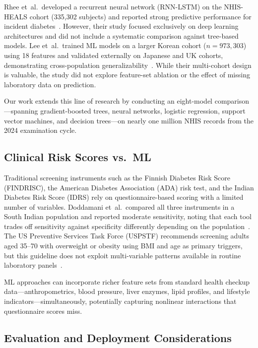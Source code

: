 Rhee et~al.\ developed a recurrent neural network (RNN-LSTM) on the NHIS-HEALS cohort (335{,}302 subjects) and reported strong predictive performance for incident diabetes~\cite{Rhee2021deeplearning}.  However, their study focused exclusively on deep learning architectures and did not include a systematic comparison against tree-based models.  Lee et~al.\ trained ML models on a larger Korean cohort ($n = 973{,}303$) using 18 features and validated externally on Japanese and UK cohorts, demonstrating cross-population generalizability~\cite{Lee2025multicohort}.  While their multi-cohort design is valuable, the study did not explore feature-set ablation or the effect of missing laboratory data on prediction.

Our work extends this line of research by conducting an eight-model comparison---spanning gradient-boosted trees, neural networks, logistic regression, support vector machines, and decision trees---on nearly one million NHIS records from the 2024 examination cycle.

\subsection{Clinical Risk Scores vs.\ ML}
\label{sec:rw-risk-scores}

Traditional screening instruments such as the Finnish Diabetes Risk Score (FINDRISC), the American Diabetes Association (ADA) risk test, and the Indian Diabetes Risk Score (IDRS) rely on questionnaire-based scoring with a limited number of variables.  Doddamani et~al.\ compared all three instruments in a South Indian population and reported moderate sensitivity, noting that each tool trades off sensitivity against specificity differently depending on the population~\cite{Doddamani2021comparative}.  The US Preventive Services Task Force (USPSTF) recommends screening adults aged 35--70 with overweight or obesity using BMI and age as primary triggers, but this guideline does not exploit multi-variable patterns available in routine laboratory panels~\cite{USPSTF2021screening}.

ML approaches can incorporate richer feature sets from standard health checkup data---anthropometrics, blood pressure, liver enzymes, lipid profiles, and lifestyle indicators---simultaneously, potentially capturing nonlinear interactions that questionnaire scores miss.

\subsection{Evaluation and Deployment Considerations}
\label{sec:rw-evaluation}

